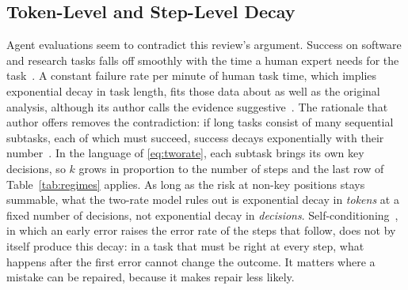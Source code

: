 \documentclass{ieeeaccess}
\begin{document}
\subsection{Token-Level and Step-Level Decay}
Agent evaluations seem to contradict this review's argument. Success on software and research tasks falls off smoothly with the time a human expert needs for the task~\cite{kwa2025measuring}. A constant failure rate per minute of human task time, which implies exponential decay in task length, fits those data about as well as the original analysis, although its author calls the evidence suggestive~\cite{ord2025halflife}. The rationale that author offers removes the contradiction: if long tasks consist of many sequential subtasks, each of which must succeed, success decays exponentially with their number~\cite{ord2025halflife}. In the language of \eqref{eq:tworate}, each subtask brings its own key decisions, so $k$ grows in proportion to the number of steps and the last row of Table~\ref{tab:regimes} applies. As long as the risk at non-key positions stays summable, what the two-rate model rules out is exponential decay in \emph{tokens} at a fixed number of decisions, not exponential decay in \emph{decisions}. Self-conditioning~\cite{sinha2025illusion}, in which an early error raises the error rate of the steps that follow, does not by itself produce this decay: in a task that must be right at every step, what happens after the first error cannot change the outcome. It matters where a mistake can be repaired, because it makes repair less likely.
\end{document}
